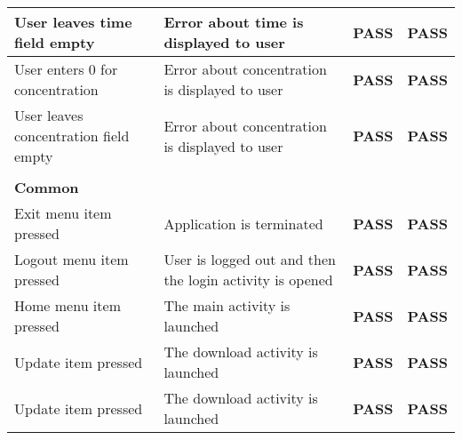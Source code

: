 \documentclass[11pt,fleqn,twoside]{article}
\begin{document}
\begin{center}
\begin{longtable}{| p{5cm} | p{5cm} | c | c |}
User leaves time field empty                                               & Error about time is displayed to user                                                            & \textbf{PASS}         & \textbf{PASS}          \\ \hline
User enters 0 for concentration                                            & Error about concentration is displayed to user                                                   & \textbf{PASS}         & \textbf{PASS}          \\ \hline
User leaves concentration field empty                                      & Error about concentration is displayed to user                                                   & \textbf{PASS}         & \textbf{PASS}          \\ \hline
                                                                           &                                                                                                  & \textbf{}             & \textbf{}              \\ \hline
\textbf{Common}                                                            &                                                                                                  & \textbf{}             & \textbf{}              \\ \hline
Exit menu item pressed                                                     & Application is terminated                                                                        & \textbf{PASS}         & \textbf{PASS}          \\ \hline
Logout menu item pressed                                                   & User is logged out and then the login activity is opened                                         & \textbf{PASS}         & \textbf{PASS}          \\ \hline
Home menu item pressed                                                     & The main activity is launched                                                                    & \textbf{PASS}         & \textbf{PASS}          \\ \hline
Update item pressed                                                        & The download activity is launched                                                                & \textbf{PASS}         & \textbf{PASS}          \\ \hline
Update item pressed                                                        & The download activity is launched                                                                & \textbf{PASS}         & \textbf{PASS}          \\ \hline

\end{longtable}
\end{center}
\end{document}
